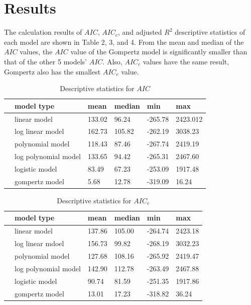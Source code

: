 \documentclass[11pt]{article}
\begin{document}
\newpage
\section{Results}
The calculation results of $AIC$, $AIC_c$, and adjusted $R^2$ descriptive statistics of each model are shown in Table 2, 3, and 4. From the mean and median of the $AIC$ values, the $AIC$ value of the Gompertz model is significantly smaller than that of the other 5 models' $AIC$. Also, $AIC_c$ values have the same result, Gompertz also has the smallest $AIC_c$ value. \\

\begin{table}[H]
\centering
\caption{Descriptive statistics for $AIC$}
\begin{tabular}{llllll}
\toprule
& \textbf{model type} & \textbf{mean}& \textbf{median} & \textbf{min} & \textbf{max} \\ \toprule
 & linear model & 133.02 & 96.24 & -265.78 & 2423.012 \\
 & log linear model & 162.73  & 105.82 & -262.19 & 3038.23 \\
 & polynomial model & 118.43 & 87.46 & -267.74 & 2419.19 \\
 & log polynomial model & 133.65  & 94.42 & -265.31 & 2467.60 \\
 & logistic model & 83.49 & 67.23 & -253.09 & 1917.48 \\
 & gompertz model & 5.68 & 12.78 & -319.09 & 16.24 \\ 
 \bottomrule
\end{tabular}
\end{table}

\begin{table}[H]
\centering
\caption{Descriptive statistics for $AIC_c$}
\begin{tabular}{llllll}
\toprule
 & \textbf{model type} & \textbf{mean}& \textbf{median} & \textbf{min} & \textbf{max}              \\ \toprule
 & linear model         & 137.86 & 105.00 & -264.74 & 2423.18 \\
 & log linear mdoel     & 156.73  & 99.82 & -268.19 & 3032.23 \\
 & polynomial model     & 127.68 & 108.16 & -265.92 & 2419.47 \\
 & log polynomial model & 142.90  & 112.78 & -263.49 & 2467.88 \\
 & logistic model       & 90.74 & 81.59 & -251.35 & 1917.86 \\
 & gompertz model       & 13.01 & 17.23 & -318.82 & 36.24\\
\bottomrule
\end{tabular}
\end{table}
\end{document}
